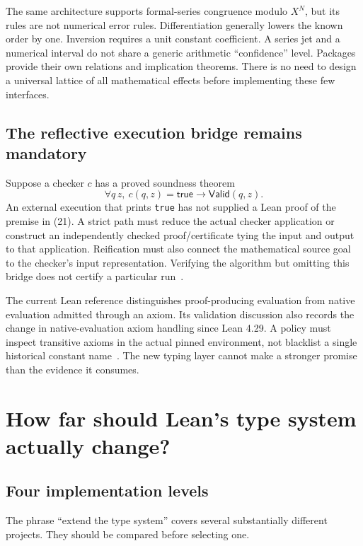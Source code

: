 \documentclass[11pt,letterpaper]{article}
\newcommand{\code}[1]{\nolinkurl{#1}}
\theoremstyle{definition}
\theoremstyle{remark}
\begin{document}
The same architecture supports formal-series congruence modulo $X^N$, but its
rules are not numerical error rules. Differentiation generally lowers the known
order by one. Inversion requires a unit constant coefficient. A series jet and a
numerical interval do not share a generic arithmetic ``confidence'' level.
Packages provide their own relations and implication theorems. There is no need
to design a universal lattice of all mathematical effects before implementing
these few interfaces.

\subsection{The reflective execution bridge remains mandatory}
Suppose a checker $c$ has a proved soundness theorem
\[
\forall q\,z,\ c(q,z)=\mathsf{true}\to\mathsf{Valid}(q,z).
\tag{21}
\]
An external execution that prints \code{true} has not supplied a Lean proof of the
premise in (21). A strict path must reduce the actual checker application or
construct an independently checked proof/certificate tying the input and output
to that application. Reification must also connect the mathematical source goal
to the checker's input representation. Verifying the algorithm but omitting
this bridge does not certify a particular run~\cite{B1,B2,LeanValid}.

The current Lean reference distinguishes proof-producing evaluation from
native evaluation admitted through an axiom. Its validation discussion also
records the change in native-evaluation axiom handling since Lean 4.29. A policy
must inspect transitive axioms in the actual pinned environment, not blacklist a
single historical constant name~\cite{LeanValid,LeanTactics}. The new typing
layer cannot make a stronger promise than the evidence it consumes.

\section{How far should Lean's type system actually change?}\label{sec:kernel}

\subsection{Four implementation levels}
The phrase ``extend the type system'' covers several substantially different
projects. They should be compared before selecting one.
\end{document}
